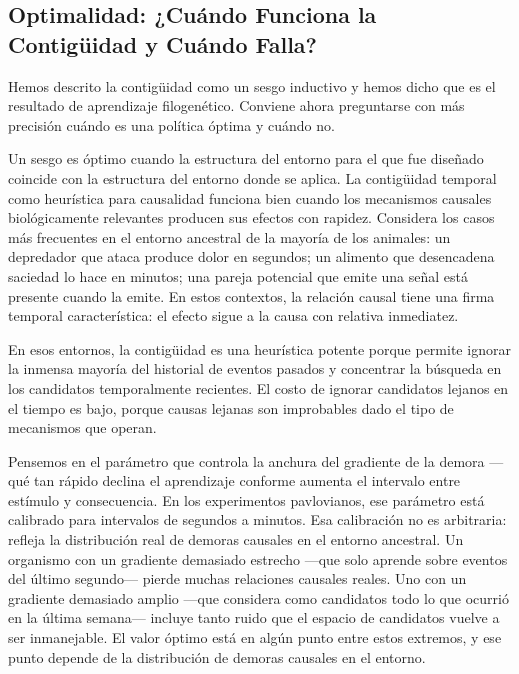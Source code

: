 \documentclass[
  letterpaper,
  DIV=11,
  numbers=noendperiod]{scrreprt}
\begin{document}
\begin{tcolorbox}[enhanced jigsaw, arc=.35mm, bottomrule=.15mm, breakable, colback=white, colframe=quarto-callout-note-color-frame, left=2mm, leftrule=.75mm, opacityback=0, rightrule=.15mm, toprule=.15mm]
\section{Optimalidad: ¿Cuándo Funciona la Contigüidad y Cuándo
Falla?}\label{optimalidad-cuuxe1ndo-funciona-la-contiguxfcidad-y-cuuxe1ndo-falla}

Hemos descrito la contigüidad como un sesgo inductivo y hemos dicho que
es el resultado de aprendizaje filogenético. Conviene ahora preguntarse
con más precisión cuándo es una política óptima y cuándo no.

Un sesgo es óptimo cuando la estructura del entorno para el que fue
diseñado coincide con la estructura del entorno donde se aplica. La
contigüidad temporal como heurística para causalidad funciona bien
cuando los mecanismos causales biológicamente relevantes producen sus
efectos con rapidez. Considera los casos más frecuentes en el entorno
ancestral de la mayoría de los animales: un depredador que ataca produce
dolor en segundos; un alimento que desencadena saciedad lo hace en
minutos; una pareja potencial que emite una señal está presente cuando
la emite. En estos contextos, la relación causal tiene una firma
temporal característica: el efecto sigue a la causa con relativa
inmediatez.

En esos entornos, la contigüidad es una heurística potente porque
permite ignorar la inmensa mayoría del historial de eventos pasados y
concentrar la búsqueda en los candidatos temporalmente recientes. El
costo de ignorar candidatos lejanos en el tiempo es bajo, porque causas
lejanas son improbables dado el tipo de mecanismos que operan.

Pensemos en el parámetro que controla la anchura del gradiente de la
demora ---qué tan rápido declina el aprendizaje conforme aumenta el
intervalo entre estímulo y consecuencia. En los experimentos
pavlovianos, ese parámetro está calibrado para intervalos de segundos a
minutos. Esa calibración no es arbitraria: refleja la distribución real
de demoras causales en el entorno ancestral. Un organismo con un
gradiente demasiado estrecho ---que solo aprende sobre eventos del
último segundo--- pierde muchas relaciones causales reales. Uno con un
gradiente demasiado amplio ---que considera como candidatos todo lo que
ocurrió en la última semana--- incluye tanto ruido que el espacio de
candidatos vuelve a ser inmanejable. El valor óptimo está en algún punto
entre estos extremos, y ese punto depende de la distribución de demoras
causales en el entorno.


\end{tcolorbox}
\end{document}
